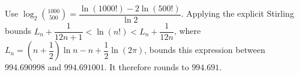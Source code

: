 Use $\log_2\binom{1000}{500}=\dfrac{\ln(1000!)-2\ln(500!)}{\ln2}$. Applying the explicit Stirling bounds $L_n+\dfrac{1}{12n+1}<\ln(n!)<L_n+\dfrac{1}{12n}$, where $L_n=(n+\dfrac{1}{2})\ln n-n+\dfrac{1}{2}\ln(2\pi)$, bounds this expression between $994.690998$ and $994.691001$. It therefore rounds to $\boxed{994.691}$.
